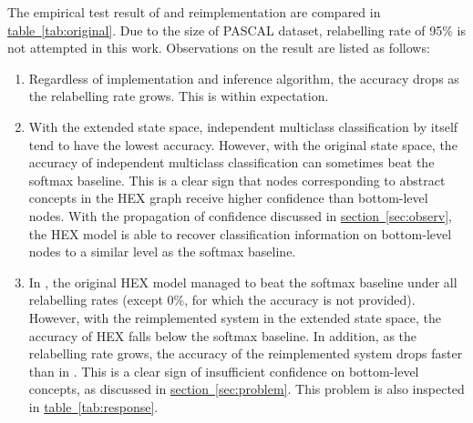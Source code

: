 \documentclass[11pt,a4paper]{article}
\begin{document}
The empirical test result of \cite{deng2014large} and reimplementation are compared in \hyperref[tab:original]{table~\ref{tab:original}}. Due to the size of PASCAL dataset, relabelling rate of 95\% is not attempted in this work. Observations on the result are listed as follows:
\begin{enumerate}
\item Regardless of implementation and inference algorithm, the accuracy drops as the relabelling rate grows. This is within expectation.
\item With the extended state space, independent multiclass classification by itself tend to have the lowest accuracy. However, with the original state space, the accuracy of independent multiclass classification can sometimes beat the softmax baseline. This is a clear sign that nodes corresponding to abstract concepts in the HEX graph receive higher confidence than bottom-level nodes. With the propagation of confidence discussed in \hyperref[sec:observ]{section~\ref{sec:observ}}, the HEX model is able to recover classification information on bottom-level nodes to a similar level as the softmax baseline.
\item In \cite{deng2014large}, the original HEX model managed to beat the softmax baseline under all relabelling rates (except 0\%, for which the accuracy is not provided). However, with the reimplemented system in the extended state space, the accuracy of HEX falls below the softmax baseline. In addition, as the relabelling rate grows, the accuracy of the reimplemented system drops faster than in \cite{deng2014large}. This is a clear sign of insufficient confidence on bottom-level concepts, as discussed in \hyperref[sec:problem]{section~\ref{sec:problem}}. This problem is also inspected in \hyperref[tab:response]{table~\ref{tab:response}}.
\end{enumerate}
\end{document}

